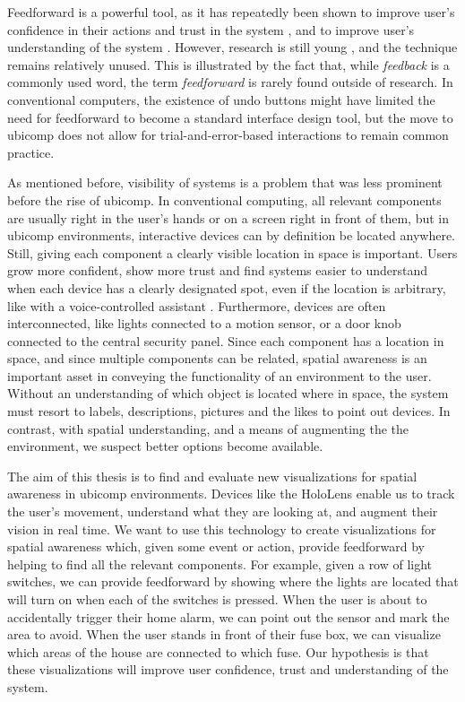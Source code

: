 Feedforward is a powerful tool, as it has repeatedly been shown to improve user's confidence in their actions and trust in the system \cite{vermeulen2009bet, park2014previewable}, and to improve user's understanding of the system \cite{bau2008octopocus, vermeulen2009bet, vermeulen2012understanding, vermeulen2013intelligibility}. However, research is still young \cite{vermeulen2013crossing}, and the technique remains relatively unused. This is illustrated by the fact that, while \textit{feedback} is a commonly used word, the term \textit{feedforward} is rarely found outside of research. In conventional computers, the existence of undo buttons might have limited the need for feedforward to become a standard interface design tool, but the move to ubicomp does not allow for trial-and-error-based interactions to remain common practice.

As mentioned before, visibility of systems is a problem that was less prominent before the rise of ubicomp. In conventional computing, all relevant components are usually right in the user's hands or on a screen right in front of them, but in ubicomp environments, interactive devices can by definition be located anywhere. Still, giving each component a clearly visible location in space is important. Users grow more confident, show more trust and find systems easier to understand when each device has a clearly designated spot, even if the location is arbitrary, like with a voice-controlled assistant \cite{vermeulen2009bet}. Furthermore, devices are often interconnected, like lights connected to a motion sensor, or a door knob connected to the central security panel. Since each component has a location in space, and since multiple components can be related, spatial awareness is an important asset in conveying the functionality of an environment to the user. Without an understanding of which object is located where in space, the system must resort to labels, descriptions, pictures and the likes to point out devices. In contrast, with spatial understanding, and a means of augmenting the the environment, we suspect better options become available.

The aim of this thesis is to find and evaluate new visualizations for spatial awareness in ubicomp environments. Devices like the HoloLens enable us to track the user's movement, understand what they are looking at, and augment their vision in real time. We want to use this technology to create visualizations for spatial awareness which, given some event or action, provide feedforward by helping to find all the relevant components. For example, given a row of light switches, we can provide feedforward by showing where the lights are located that will turn on when each of the switches is pressed. When the user is about to accidentally trigger their home alarm, we can point out the sensor and mark the area to avoid. When the user stands in front of their fuse box, we can visualize which areas of the house are connected to which fuse. Our hypothesis is that these visualizations will improve user confidence, trust and understanding of the system.


